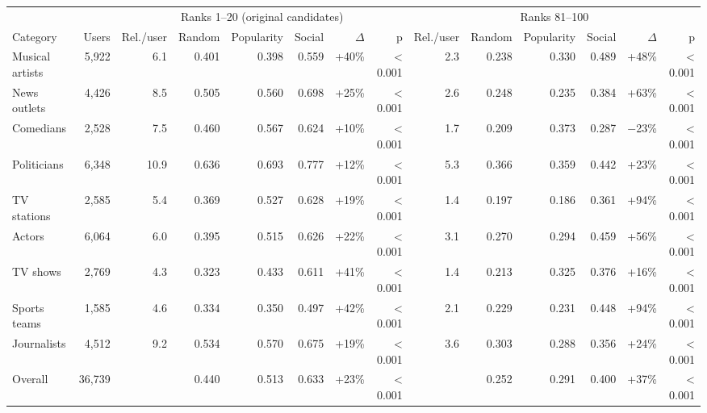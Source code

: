 \begin{tabular}{lrrrrrrrrrrrrr}
\toprule
 &  & \multicolumn{6}{c}{Ranks 1--20 (original candidates)} & \multicolumn{6}{c}{Ranks 81--100} \\
Category & Users & Rel./user & Random & Popularity & Social & $\Delta$ & p & Rel./user & Random & Popularity & Social & $\Delta$ & p \\
\midrule
Musical artists & 5,922 & 6.1 & 0.401 & 0.398 & 0.559 & +40\% & \textless{} 0.001 & 2.3 & 0.238 & 0.330 & 0.489 & +48\% & \textless{} 0.001 \\
News outlets & 4,426 & 8.5 & 0.505 & 0.560 & 0.698 & +25\% & \textless{} 0.001 & 2.6 & 0.248 & 0.235 & 0.384 & +63\% & \textless{} 0.001 \\
Comedians & 2,528 & 7.5 & 0.460 & 0.567 & 0.624 & +10\% & \textless{} 0.001 & 1.7 & 0.209 & 0.373 & 0.287 & $-$23\% & \textless{} 0.001 \\
Politicians & 6,348 & 10.9 & 0.636 & 0.693 & 0.777 & +12\% & \textless{} 0.001 & 5.3 & 0.366 & 0.359 & 0.442 & +23\% & \textless{} 0.001 \\
TV stations & 2,585 & 5.4 & 0.369 & 0.527 & 0.628 & +19\% & \textless{} 0.001 & 1.4 & 0.197 & 0.186 & 0.361 & +94\% & \textless{} 0.001 \\
Actors & 6,064 & 6.0 & 0.395 & 0.515 & 0.626 & +22\% & \textless{} 0.001 & 3.1 & 0.270 & 0.294 & 0.459 & +56\% & \textless{} 0.001 \\
TV shows & 2,769 & 4.3 & 0.323 & 0.433 & 0.611 & +41\% & \textless{} 0.001 & 1.4 & 0.213 & 0.325 & 0.376 & +16\% & \textless{} 0.001 \\
Sports teams & 1,585 & 4.6 & 0.334 & 0.350 & 0.497 & +42\% & \textless{} 0.001 & 2.1 & 0.229 & 0.231 & 0.448 & +94\% & \textless{} 0.001 \\
Journalists & 4,512 & 9.2 & 0.534 & 0.570 & 0.675 & +19\% & \textless{} 0.001 & 3.6 & 0.303 & 0.288 & 0.356 & +24\% & \textless{} 0.001 \\
\midrule
Overall & 36,739 &  & 0.440 & 0.513 & 0.633 & +23\% & \textless{} 0.001 &  & 0.252 & 0.291 & 0.400 & +37\% & \textless{} 0.001 \\
\bottomrule
\end{tabular}
